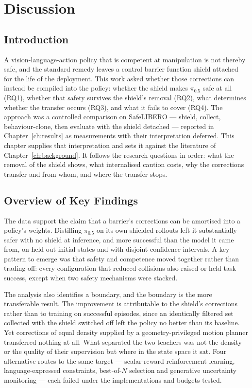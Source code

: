 

\chapter{Discussion}\label{ch:discussion}

\section{Introduction}\label{sec:disc:intro}

A vision-language-action policy that is competent at manipulation is not thereby safe, and the
standard remedy leaves a control barrier function shield attached for the life of the deployment.
This work asked whether those corrections can instead be compiled into the policy: whether the
shield makes $\pi_{0.5}$ safe at all (RQ1), whether that safety survives the shield's removal
(RQ2), what determines whether the transfer occurs (RQ3), and what it fails to cover (RQ4). The
approach was a controlled comparison on SafeLIBERO --- shield, collect, behaviour-clone, then
evaluate with the shield detached --- reported in Chapter~\ref{ch:results} as measurements with
their interpretation deferred. This chapter supplies that interpretation and sets it against the
literature of Chapter~\ref{ch:background}. It follows the research questions in order: what the
removal of the shield shows, what internalised caution costs, why the corrections transfer and from
whom, and where the transfer stops.

\section{Overview of Key Findings}\label{sec:disc:overview}

The data support the claim that a barrier's corrections can be amortised into a policy's weights.
Distilling $\pi_{0.5}$ on its own shielded rollouts left it substantially safer with no shield at
inference, and more successful than the model it came from, on held-out initial states and with
disjoint confidence intervals. A key pattern to emerge was that safety and competence moved
together rather than trading off: every configuration that reduced collisions also raised or held
task success, except when two safety mechanisms were stacked.

The analysis also identifies a boundary, and the boundary is the more transferable result. The
improvement is attributable to the shield's corrections rather than to training on successful
episodes, since an identically filtered set collected with the shield switched off left the policy
no better than its baseline. Yet corrections of equal density supplied by a geometry-privileged
motion planner transferred nothing at all. What separated the two teachers was not the density or
the quality of their supervision but where in the state space it sat. Four alternative routes to
the same target --- scalar-reward reinforcement learning, language-expressed constraints,
best-of-$N$ selection and generative uncertainty monitoring --- each failed under the
implementations and budgets tested.

